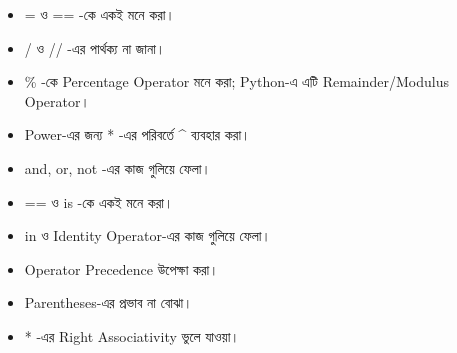\begin{rememberbox}

\begin{itemize}

\item
\textenglish{\ttfamily =}
ও
\textenglish{\ttfamily ==}
-কে একই মনে করা।

\item
\textenglish{\ttfamily /}
ও
\textenglish{\ttfamily //}
-এর পার্থক্য না জানা।

\item
\textenglish{\ttfamily \%}
-কে Percentage Operator মনে করা; Python-এ এটি Remainder/Modulus Operator।

\item Power-এর জন্য
\textenglish{\ttfamily **}
-এর পরিবর্তে
\textenglish{\ttfamily \textasciicircum}
ব্যবহার করা।

\item
\textenglish{\ttfamily and},
\textenglish{\ttfamily or},
\textenglish{\ttfamily not}
-এর কাজ গুলিয়ে ফেলা।

\item
\textenglish{\ttfamily ==}
ও
\textenglish{\ttfamily is}
-কে একই মনে করা।

\item
\textenglish{\ttfamily in}
ও Identity Operator-এর কাজ গুলিয়ে ফেলা।

\item Operator Precedence উপেক্ষা করা।

\item Parentheses-এর প্রভাব না বোঝা।

\item
\textenglish{\ttfamily **}
-এর Right Associativity ভুলে যাওয়া।

\end{itemize}

\end{rememberbox}


